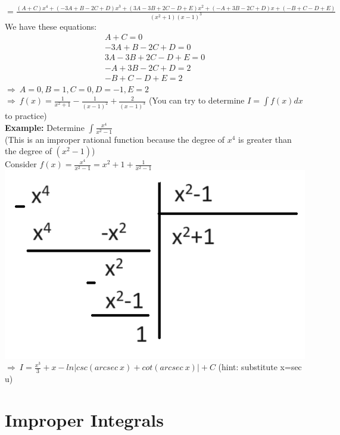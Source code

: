 \documentclass{article}
\begin{document}
$=\displaystyle\frac{(A+C)x^4+(-3A+B-2C+D)x^3+(3A-3B+2C-D+E)x^2+(-A+3B-2C+D)x+(-B+C-D+E)}{(x^2+1)(x-1)^3}$\\  
We have these equations:
\begin{align*}
    A+C=0\\
    -3A+B-2C+D=0\\
    3A-3B+2C-D+E=0\\
    -A+3B-2C+D=2\\
    -B+C-D+E=2
\end{align*}
$\Rightarrow\ A=0,B=1,C=0,D=-1,E=2$\\
$\Rightarrow\ f(x)=\displaystyle\frac{1}{x^2+1}-\frac{1}{(x-1)^2}+\frac{2}{(x-1)^3}$ (You can try to determine $I=\int f(x)dx$ to practice)\\
\textbf{Example:} Determine $\displaystyle\int\frac{x^4}{x^2-1}$\\
(This is an improper rational function because the degree of $x^4$ is greater than the degree of $(x^2-1)$)\\
Consider $f(x)=\displaystyle\frac{x^4}{x^2-1}=x^2+1+\frac{1}{x^2-1}$\\
\includegraphics[width=0.5\linewidth]{divi.png}\\
$\Rightarrow\ I=\displaystyle\frac{x^3}{3}+x-ln\left|csc(arcsec\ x)+cot(arcsec\ x)\right|+C$ (hint: substitute x=sec u)\\
\section{Improper Integrals}
\end{document}
